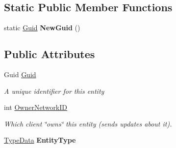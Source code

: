 \subsection*{Static Public Member Functions}
\begin{DoxyCompactItemize}
\item 
\hypertarget{class_skyrates_1_1_common_1_1_entity_1_1_entity_ace456648a3f02f014603fd4a0d38e468}{static \hyperlink{class_skyrates_1_1_common_1_1_entity_1_1_entity_ae32af79e6a33bed16aeb0455078885c8}{Guid} {\bfseries New\-Guid} ()}\label{class_skyrates_1_1_common_1_1_entity_1_1_entity_ace456648a3f02f014603fd4a0d38e468}

\end{DoxyCompactItemize}
\subsection*{Public Attributes}
\begin{DoxyCompactItemize}
\item 
Guid \hyperlink{class_skyrates_1_1_common_1_1_entity_1_1_entity_ae32af79e6a33bed16aeb0455078885c8}{Guid}
\begin{DoxyCompactList}\small\item\em A unique identifier for this entity \end{DoxyCompactList}\item 
int \hyperlink{class_skyrates_1_1_common_1_1_entity_1_1_entity_a855cbcf588c2b4c490c2ddc157e11029}{Owner\-Network\-I\-D}
\begin{DoxyCompactList}\small\item\em Which client \char`\"{}owns\char`\"{} this entity (sends updates about it). \end{DoxyCompactList}\item 
\hypertarget{class_skyrates_1_1_common_1_1_entity_1_1_entity_a8ef114b37dd21d60738f10e02ace66a2}{\hyperlink{class_skyrates_1_1_common_1_1_entity_1_1_entity_1_1_type_data}{Type\-Data} {\bfseries Entity\-Type}}\label{class_skyrates_1_1_common_1_1_entity_1_1_entity_a8ef114b37dd21d60738f10e02ace66a2}

\end{DoxyCompactItemize}
